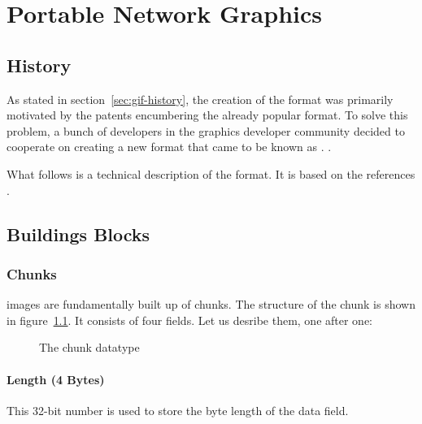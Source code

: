 \begin{comment}
  
\end{comment}

\chapter{Portable Network Graphics}
\label{cha:png}

\newcommand{\chnk}[1]{``#1''}

\section{History}

As stated in section~\ref{sec:gif-history}, the creation of the \png
format was primarily motivated by the patents encumbering the already
popular \gif format. To solve this problem, a bunch of developers in
the graphics developer community decided to cooperate on creating a
new format that came to be known as \png.
\cite{roelofs09:_histor_portab_networ_graph_png_format,roelofs99:_png,roelofs:_portab_networ_graph_main}.

What follows is a technical description of the \png format. It is based
on the references
\cite{boutel:_png_portab_networ_graph_specif_version12,roelofs99:_png,boutel:_png_portab_networ_graph_specif_version11}.

\section{Buildings Blocks}

\subsection{Chunks}

\png images are fundamentally built up of chunks. The structure of the
chunk is shown in figure~\ref{fig:png-chunk}. It consists of four
fields. Let us desribe them, one after one:

\begin{figure}
  \centering
  \caption{The \png chunk datatype}
  \label{fig:png-chunk}
\end{figure}

\subsubsection*{Length (4 Bytes)}

This 32-bit number is used to store the byte length of the data
field.

